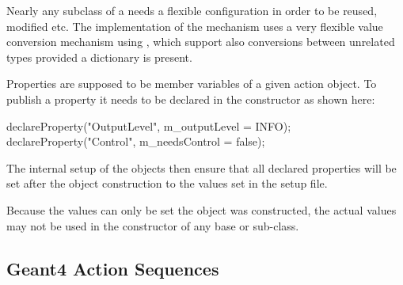 \documentclass[10pt,a4paper]{article}
\begin{document}
\noindent
Nearly any subclass of a  needs a flexible configuration 
in order to be reused, modified etc. The implementation of the mechanism
uses a very flexible value conversion mechanism using ,
which support also conversions between unrelated types provided a dictionary 
is present.

\noindent
Properties are supposed to be member variables of a given action object.
To publish a property it needs to be declared in the constructor as shown here:
\begin{unnumberedcode}
  declareProperty("OutputLevel", m_outputLevel = INFO);
  declareProperty("Control",     m_needsControl = false);
\end{unnumberedcode}
The internal setup of the  objects then ensure that 
all declared properties will be set after the object construction to the 
values set in the setup file.

\noindent
{} Because the values can only be set  the object 
was constructed, the actual values may not be used in the constructor
of any base or sub-class.

\subsection{Geant4 Action Sequences}
\label{sec:ddg4-user-manual-implementation-geant4action-sequences}
\end{document}
